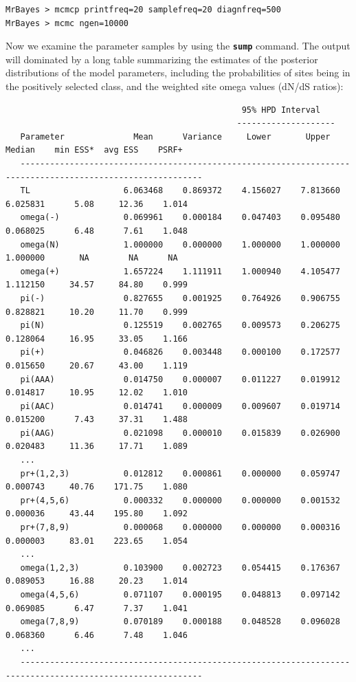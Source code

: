 \documentclass[12pt]{book}
\newcommand{\ttt}[1]{\texttt{#1}}
\newcommand{\tb}[1]{\ttt{\textbf{#1}}}
\begin{document}
\begin{singlespacing}
\footnotesize
\begin{verbatim}
MrBayes > mcmcp printfreq=20 samplefreq=20 diagnfreq=500
MrBayes > mcmc ngen=10000
\end{verbatim}
\normalsize
\end{singlespacing}

Now we examine the parameter samples by using the \tb{sump} command. The output will dominated by a
long table summarizing the estimates of the posterior distributions of the model parameters,
including the probabilities of sites being in the positively selected class, and the weighted site
omega values (dN/dS ratios):


\begin{singlespacing}
\tiny
\begin{verbatim}
                                                95% HPD Interval
                                               --------------------
   Parameter              Mean      Variance     Lower       Upper       Median    min ESS*  avg ESS    PSRF+ 
   -----------------------------------------------------------------------------------------------------------
   TL                   6.063468    0.869372    4.156027    7.813660    6.025831      5.08     12.36    1.014
   omega(-)             0.069961    0.000184    0.047403    0.095480    0.068025      6.48      7.61    1.048
   omega(N)             1.000000    0.000000    1.000000    1.000000    1.000000       NA        NA      NA   
   omega(+)             1.657224    1.111911    1.000940    4.105477    1.112150     34.57     84.80    0.999
   pi(-)                0.827655    0.001925    0.764926    0.906755    0.828821     10.20     11.70    0.999
   pi(N)                0.125519    0.002765    0.009573    0.206275    0.128064     16.95     33.05    1.166
   pi(+)                0.046826    0.003448    0.000100    0.172577    0.015650     20.67     43.00    1.119
   pi(AAA)              0.014750    0.000007    0.011227    0.019912    0.014817     10.95     12.02    1.010
   pi(AAC)              0.014741    0.000009    0.009607    0.019714    0.015200      7.43     37.31    1.488
   pi(AAG)              0.021098    0.000010    0.015839    0.026900    0.020483     11.36     17.71    1.089
   ...
   pr+(1,2,3)           0.012812    0.000861    0.000000    0.059747    0.000743     40.76    171.75    1.080
   pr+(4,5,6)           0.000332    0.000000    0.000000    0.001532    0.000036     43.44    195.80    1.092
   pr+(7,8,9)           0.000068    0.000000    0.000000    0.000316    0.000003     83.01    223.65    1.054
   ...
   omega(1,2,3)         0.103900    0.002723    0.054415    0.176367    0.089053     16.88     20.23    1.014
   omega(4,5,6)         0.071107    0.000195    0.048813    0.097142    0.069085      6.47      7.37    1.041
   omega(7,8,9)         0.070189    0.000188    0.048528    0.096028    0.068360      6.46      7.48    1.046
   ...
   -----------------------------------------------------------------------------------------------------------

\end{verbatim}
\normalsize
\end{singlespacing}
\end{document}
